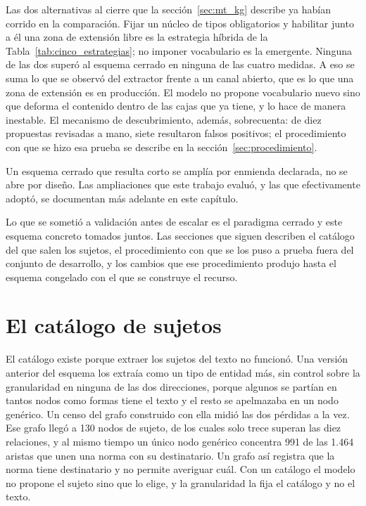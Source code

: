 \documentclass[12pt,a4paper]{report}
\begin{document}
Las dos alternativas al cierre que la sección~\ref{sec:mt_kg} describe ya habían corrido en la comparación. Fijar un núcleo de tipos obligatorios y habilitar junto a él una zona de extensión libre es la estrategia híbrida de la Tabla~\ref{tab:cinco_estrategias}; no imponer vocabulario es la emergente. Ninguna de las dos superó al esquema cerrado en ninguna de las cuatro medidas. A eso se suma lo que se observó del extractor frente a un canal abierto, que es lo que una zona de extensión es en producción. El modelo no propone vocabulario nuevo sino que deforma el contenido dentro de las cajas que ya tiene, y lo hace de manera inestable. El mecanismo de descubrimiento, además, sobrecuenta: de diez propuestas revisadas a mano, siete resultaron falsos positivos; el procedimiento con que se hizo esa prueba se describe en la sección~\ref{sec:procedimiento}.

Un esquema cerrado que resulta corto se amplía por enmienda declarada, no se abre por diseño. Las ampliaciones que este trabajo evaluó, y las que efectivamente adoptó, se documentan más adelante en este capítulo.

Lo que se sometió a validación antes de escalar es el paradigma cerrado y este esquema concreto tomados juntos. Las secciones que siguen describen el catálogo del que salen los sujetos, el procedimiento con que se los puso a prueba fuera del conjunto de desarrollo, y los cambios que ese procedimiento produjo hasta el esquema congelado con el que se construye el recurso.

\section{El catálogo de sujetos}
\label{sec:catalogo}

El catálogo existe porque extraer los sujetos del texto no funcionó. Una versión anterior del esquema los extraía como un tipo de entidad más, sin control sobre la granularidad en ninguna de las dos direcciones, porque algunos se partían en tantos nodos como formas tiene el texto y el resto se apelmazaba en un nodo genérico. Un censo del grafo construido con ella midió las dos pérdidas a la vez. Ese grafo llegó a 130 nodos de sujeto, de los cuales solo trece superan las diez relaciones, y al mismo tiempo un único nodo genérico concentra 991 de las 1.464 aristas que unen una norma con su destinatario. Un grafo así registra que la norma tiene destinatario y no permite averiguar cuál. Con un catálogo el modelo no propone el sujeto sino que lo elige, y la granularidad la fija el catálogo y no el texto.
\end{document}
